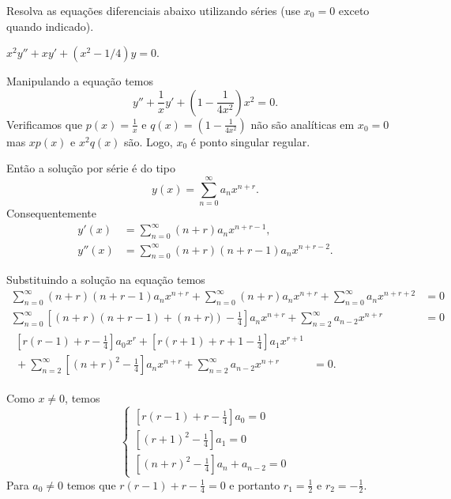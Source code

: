 \documentclass[a4paper,12pt, leqno, answers]{exam}
\begin{document}
Resolva as equa\c{c}\~{o}es diferenciais abaixo utilizando s\'{e}ries (use $x_0 = 0$ exceto quando indicado).
\begin{questions}
    \question $x^2 y'' + x y' + \left( x^2 - 1/4 \right) y = 0$.
    \begin{solution}
        Manipulando a equa\c{c}\~{a}o temos
        \[
        y'' + \frac{1}{x} y' + \left( 1 -\frac{1}{4x^2} \right) x^2 = 0.
        \]
        Verificamos que $p\left( x \right) = \frac{1}{x}$ e $q\left( x \right) = \left( 1 - \frac{1}{4x^2} \right)$ n\~{a}o s\~{a}o anal\'{i}ticas em $x_0 = 0$ mas $x p\left( x \right)$ e $x^2 q\left( x \right)$ s\~{a}o. Logo, $x_0$ \'{e} ponto singular regular.

        Ent\~{a}o a solu\c{c}\~{a}o por s\'{e}rie \'{e} do tipo
        \[
        y\left( x \right) = \sum_{n = 0}^\infty a_n x^{n + r}.
        \]
        Consequentemente
        \begin{align*}
            y'(x) &= \sum_{n = 0}^\infty \left( n + r \right) a_n x^{n + r - 1}, \\
            y''(x) &= \sum_{n = 0}^\infty \left( n + r \right) \left( n + r - 1 \right) a_n x^{n + r - 2}.
        \end{align*}

        Substituindo a solu\c{c}\~{a}o na equa\c{c}\~{a}o temos
        \begin{align*}
            \sum_{n = 0}^\infty \left( n + r \right) \left( n + r - 1 \right) a_n x^{n + r} + \sum_{n = 0}^\infty \left( n + r \right) a_n x^{n + r} + \sum_{n = 0}^\infty a_n x^{n + r + 2} &= 0 \\
            \sum_{n = 0}^\infty \left[ \left( n + r \right) \left( n + r - 1 \right) + \left( n + r) \right) - \frac{1}{4} \right] a_n x^{n + r} + \sum_{n = 2}^\infty a_{n - 2} x^{n + r} &= 0 \\
            \begin{split}
                \left[ r \left( r - 1 \right) + r - \frac{1}{4} \right] a_0 x^r + \left[ r \left( r + 1 \right) + r + 1 - \frac{1}{4} \right] a_1 x^{r + 1} \\ {}+ \sum_{n = 2}^\infty \left[ \left( n + r \right)^2 - \frac{1}{4} \right] a_n x^{n + r} + \sum_{n = 2}^\infty a_{n - 2} x^{n + r} &= 0.
            \end{split}
        \end{align*}

        Como $x \neq 0$, temos
        \[
        \begin{cases}
            \left[ r \left( r - 1 \right) + r - \frac{1}{4} \right] a_0 = 0 \\
            \left[ \left( r + 1 \right)^2 - \frac{1}{4} \right] a_1 = 0 \\
            \left[ \left(n + r \right)^2 - \frac{1}{4} \right] a_n + a_{n-2} = 0
        \end{cases}
        \]
        Para $a_0 \neq 0$ temos que $r \left( r - 1 \right) + r - \frac{1}{4} = 0$ e portanto $r_1 = \frac{1}{2}$ e $r_2 = - \frac{1}{2}$.


\end{solution}
\end{questions}
\end{document}
